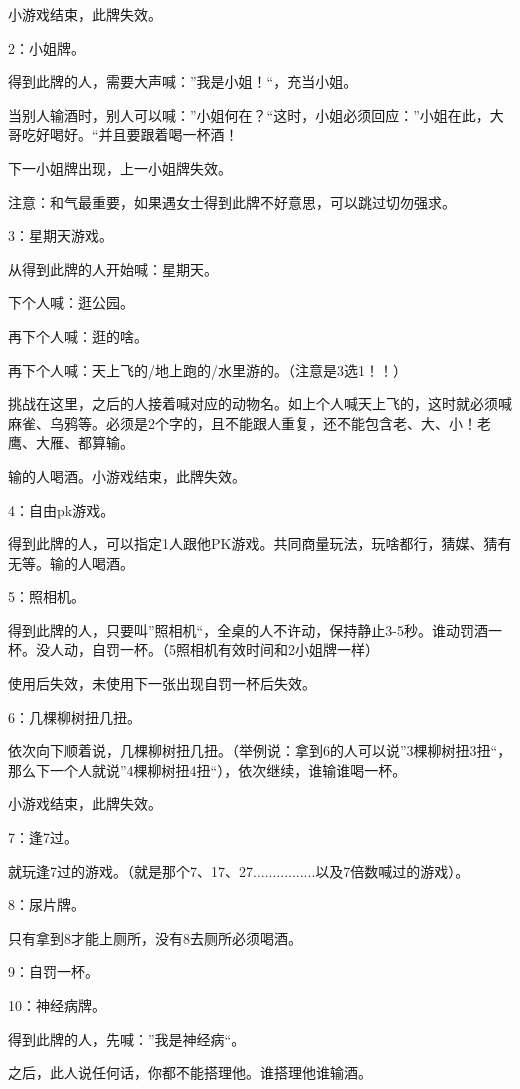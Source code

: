 \documentclass{ctexbook}
\begin{document}
小游戏结束，此牌失效。

2：小姐牌。

得到此牌的人，需要大声喊：''我是小姐！``，充当小姐。

当别人输酒时，别人可以喊：''小姐何在？``这时，小姐必须回应：''小姐在此，大哥吃好喝好。``并且要跟着喝一杯酒！

下一小姐牌出现，上一小姐牌失效。

注意：和气最重要，如果遇女士得到此牌不好意思，可以跳过切勿强求。

3：星期天游戏。

从得到此牌的人开始喊：星期天。

下个人喊：逛公园。

再下个人喊：逛的啥。

再下个人喊：天上飞的/地上跑的/水里游的。（注意是3选1！！）

挑战在这里，之后的人接着喊对应的动物名。如上个人喊天上飞的，这时就必须喊麻雀、乌鸦等。必须是2个字的，且不能跟人重复，还不能包含老、大、小！老鹰、大雁、都算输。

输的人喝酒。小游戏结束，此牌失效。



4：自由pk游戏。

得到此牌的人，可以指定1人跟他PK游戏。共同商量玩法，玩啥都行，猜媒、猜有无等。输的人喝酒。

5：照相机。

得到此牌的人，只要叫''照相机``，全桌的人不许动，保持静止3-5秒。谁动罚酒一杯。没人动，自罚一杯。（5照相机有效时间和2小姐牌一样）

使用后失效，未使用下一张出现自罚一杯后失效。

6：几棵柳树扭几扭。

依次向下顺着说，几棵柳树扭几扭。（举例说：拿到6的人可以说''3棵柳树扭3扭``，那么下一个人就说''4棵柳树扭4扭``），依次继续，谁输谁喝一杯。

小游戏结束，此牌失效。



7：逢7过。

就玩逢7过的游戏。（就是那个7、17、27................以及7倍数喊过的游戏）。

8：尿片牌。

只有拿到8才能上厕所，没有8去厕所必须喝酒。

9：自罚一杯。

10：神经病牌。

得到此牌的人，先喊：''我是神经病``。

之后，此人说任何话，你都不能搭理他。谁搭理他谁输酒。
\end{document}
